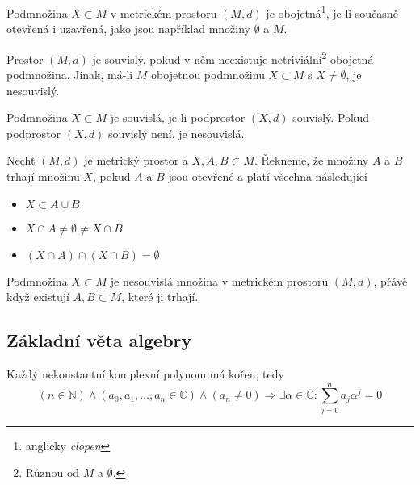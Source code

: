 \documentclass[../main.tex]{subfiles}
\begin{document}
\begin{definition}
    Podmnožina $X \subset M$ v metrickém prostoru $(M,d)$ je obojetná\footnote{anglicky \textit{clopen}}, je-li současně
    otevřená i uzavřená, jako jsou například množiny $\emptyset$ a $M$.
\end{definition}

\begin{definition}
    Prostor $(M,d)$ je souvislý, pokud v něm neexistuje netriviální\footnote{Různou od $M$ a $\emptyset$.} obojetná podmnožina.
    Jinak, má-li $M$ obojetnou podmnožinu $X \subset M$ s $X \neq \emptyset$, je nesouvislý.
\end{definition}

\begin{definition}
    Podmnožina $X\subset M$ je souvislá, je-li podprostor $(X,d)$ souvislý.
    Pokud podprostor $(X,d)$ souvislý není, je nesouvislá.
\end{definition}

\begin{definition}
    Nechť $(M,d)$ je metrický prostor a $X,A,B \subset M$. Řekneme, že množiny $A$ a $B$ \underline{trhají množinu} $X$, pokud
    $A$ a $B$ jsou otevřené a platí všechna následující 
    \begin{itemize}
        \item $X \subset A \cup B$
        \item $X \cap A \neq \emptyset \neq X \cap B$
        \item $(X \cap A) \cap (X \cap B) = \emptyset$
    \end{itemize}
\end{definition}

\begin{lemma}
    Podmnožina $X \subset M$ je nesouvislá množina v metrickém prostoru $(M,d)$, přávě
    když existují $A,B \subset M$, které ji trhají.
\end{lemma}

\subsection{Základní věta algebry}

\begin{theorem}
    Každý nekonstantní komplexní polynom má kořen, tedy
    \[ (n\in \mathbb{N})\land (a_0, a_1, \dots, a_n \in \mathbb{C}) \land (a_n \neq 0) \Rightarrow \exists \alpha \in \mathbb{C}: \sum_{j=0}^{n}a_j\alpha^j = 0 \]
\end{theorem}
\end{document}
